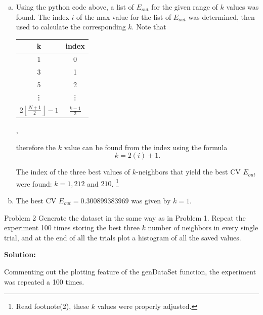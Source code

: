\documentclass[a4paper]{article}
\begin{document}
\begin {description}
\begin{doublespace}
\begin{enumerate}[(a)]
This can be seen in the python document attached.
\item




Using the python code above, a list of $E_{out}$ for the given range of $k$ values was found. The index $i$ of the max value for the list of $E_{out}$ was determined, then used to calculate the corresponding $k$. Note that 

\begin{center}
\begin{tabular}{ c | c }
  k & index \\ \hline  
  1 & 0 \\
  3 & 1 \\
  5 & 2 \\
  \vdots & \vdots \\
  $2 \left \lfloor \frac{N+1}{2} \right \rfloor-1$& $\frac{k-1}{2}$ \\
\end{tabular},
\end{center}

therefore the $k$ value can be found from the index using the formula
\[k = 2(i) +1.\]

The index of the three best values of $k$-neighbors that yield the best CV $E_{out}$ were found: $k = 1, 212 $ and $210$. \footnote{Read footnote(2), these $k$ values were properly adjusted.}

\item The best CV $E_{out} = 0.300899383969$ was given by $k = 1$.
\end{enumerate}
\end{doublespace}

\item[Problem 2] Generate the dataset in the same way as in Problem 1. Repeat the experiment 100 times storing the best three $k$ number of neighbors in every single trial, and at the end of all the trials plot a histogram of all the saved values.

\smallskip

\textbf{Solution:}
\begin{doublespace}
Commenting out the plotting feature of the genDataSet function, the experiment was repeated a 100 times.


\newpage 


\end{doublespace}
\end{description}
\end{document}
